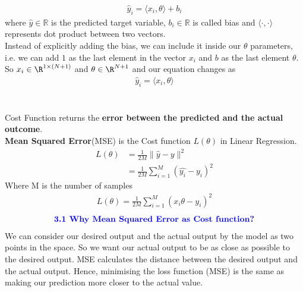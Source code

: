 \documentclass{homework}
\begin{document}
\begin{align*}
    \hat{y}_i = \langle x_i, \theta\rangle  + b_i
\end{align*}
where $\hat{y} \in \mathbb{R}$ is the predicted target variable, $b_i \in \mathbb{R}$ is called bias and $\langle \cdot,\cdot\rangle$ represents dot product between two vectors. \\
Instead of explicitly adding the bias, we can include it inside our $\theta$ parameters, i.e. we can add $1$ as the last element in the vector $x_i$ and $b$ as the last element $\theta$. So $x_i \in \R^{1\times (N+1)}$ and $\theta \in \R^{N+1}$ and our equation changes as\\
\begin{align*}
    \hat{y}_i = \langle x_i, \theta\rangle 
\end{align*}
\section{}
Cost Function returns the \textbf{error between the predicted and the actual outcome}.\\
\textbf{Mean Squared Error}(MSE) is the Cost function $L(\theta)$ in Linear Regression.
\begin{align*}
    L(\theta) &=\frac{1}{2M}\|\hat{y}-y\|^2\\
    &=\frac{1}{2M}\displaystyle\sum^{M}_{i = 1}(\hat{y_i}-y_i)^2
\end{align*}
Where M is the number of samples
\begin{align*}
     L(\theta) = \frac{1}{2M}\displaystyle\sum^{M}_{i = 1}(x_i\theta -y_i)^2
\end{align*}
\begin{align*}
  \textcolor{blue}{\textbf{3.1 Why Mean Squared Error as Cost function?}}
\end{align*}
We can consider our desired output and the actual output by the model as two points in the space. So we want our actual output to be as close as possible to the desired output. MSE calculates the distance between the desired output and the actual output. Hence, minimising the loss function (MSE) is the same as making our prediction more closer to the actual value. 


\section{}
\end{document}
